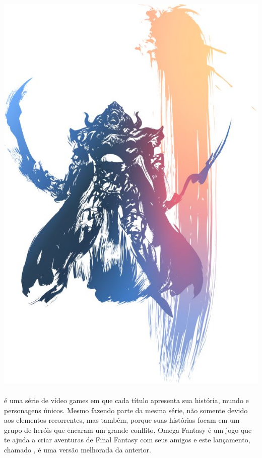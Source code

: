 %
\\\\
%
\includegraphics[width=\columnwidth]{./art/images/ff12.jpg} \\\\
%
 é uma série de vídeo games em que cada título apresenta sua história, mundo e personagens únicos.
Mesmo fazendo parte da mesma série, não somente devido aos elementos recorrentes, mas também, porque suas histórias focam em um grupo de heróis que encaram um grande conflito.
Omega Fantasy é um jogo que te ajuda a criar aventuras de Final Fantasy com seus amigos e este lançamento, chamado , é uma versão melhorada da anterior. 
